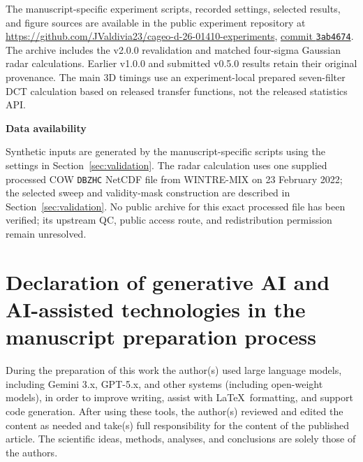 \documentclass[a4paper,fleqn]{cas-sc}
\begin{document}
The manuscript-specific experiment scripts, recorded settings, selected results, and figure sources are available in the public experiment repository at \url{https://github.com/JValdivia23/cageo-d-26-01410-experiments}, \href{https://github.com/JValdivia23/cageo-d-26-01410-experiments/tree/3ab46746882a5f82d16957f962a32762e801a578}{commit \texttt{3ab4674}}. The archive includes the v2.0.0 revalidation and matched four-sigma Gaussian radar calculations. Earlier v1.0.0 and submitted v0.5.0 results retain their original provenance. The main 3D timings use an experiment-local prepared seven-filter DCT calculation based on released transfer functions, not the released statistics API.

\noindent\textbf{Data availability}\par\nopagebreak[4]

Synthetic inputs are generated by the manuscript-specific scripts using the settings in Section~\ref{sec:validation}. The radar calculation uses one supplied processed COW \texttt{DBZHC} NetCDF file from WINTRE-MIX on 23 February 2022; the selected sweep and validity-mask construction are described in Section~\ref{sec:validation}. No public archive for this exact processed file has been verified; its upstream QC, public access route, and redistribution permission remain unresolved.

\printcredits

\section*{Declaration of generative AI and AI-assisted technologies in the manuscript preparation process}
During the preparation of this work the author(s) used large language models, including Gemini 3.x, GPT-5.x, and other systems (including open-weight models), in order to improve writing, assist with \LaTeX\ formatting, and support code generation. After using these tools, the author(s) reviewed and edited the content as needed and take(s) full responsibility for the content of the published article. The scientific ideas, methods, analyses, and conclusions are solely those of the authors.



\end{document}
